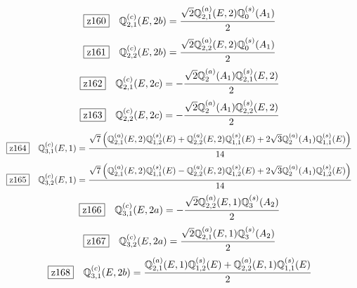 \documentclass[fleqn,10pt,landscape]{jsarticle}
\begin{document}
\begin{dmath*}
\hspace*{3mm}\fbox{z160}\quad \mathbb{Q}_{2,1}^{(c)}(E,2b)=\frac{\sqrt{2} \mathbb{Q}_{2,1}^{(a)}(E,2) \mathbb{Q}_{0}^{(s)}(A_{1})}{2}
\end{dmath*}
\begin{dmath*}
\hspace*{3mm}\fbox{z161}\quad \mathbb{Q}_{2,2}^{(c)}(E,2b)=\frac{\sqrt{2} \mathbb{Q}_{2,2}^{(a)}(E,2) \mathbb{Q}_{0}^{(s)}(A_{1})}{2}
\end{dmath*}
\begin{dmath*}
\hspace*{3mm}\fbox{z162}\quad \mathbb{Q}_{2,1}^{(c)}(E,2c)=- \frac{\sqrt{2} \mathbb{Q}_{2}^{(a)}(A_{1}) \mathbb{Q}_{2,1}^{(s)}(E,2)}{2}
\end{dmath*}
\begin{dmath*}
\hspace*{3mm}\fbox{z163}\quad \mathbb{Q}_{2,2}^{(c)}(E,2c)=- \frac{\sqrt{2} \mathbb{Q}_{2}^{(a)}(A_{1}) \mathbb{Q}_{2,2}^{(s)}(E,2)}{2}
\end{dmath*}
\begin{dmath*}
\hspace*{3mm}\fbox{z164}\quad \mathbb{Q}_{3,1}^{(c)}(E,1)=\frac{\sqrt{7} \left(\mathbb{Q}_{2,1}^{(a)}(E,2) \mathbb{Q}_{1,2}^{(s)}(E) + \mathbb{Q}_{2,2}^{(a)}(E,2) \mathbb{Q}_{1,1}^{(s)}(E) + 2 \sqrt{3} \mathbb{Q}_{2}^{(a)}(A_{1}) \mathbb{Q}_{1,1}^{(s)}(E)\right)}{14}
\end{dmath*}
\begin{dmath*}
\hspace*{3mm}\fbox{z165}\quad \mathbb{Q}_{3,2}^{(c)}(E,1)=\frac{\sqrt{7} \left(\mathbb{Q}_{2,1}^{(a)}(E,2) \mathbb{Q}_{1,1}^{(s)}(E) - \mathbb{Q}_{2,2}^{(a)}(E,2) \mathbb{Q}_{1,2}^{(s)}(E) + 2 \sqrt{3} \mathbb{Q}_{2}^{(a)}(A_{1}) \mathbb{Q}_{1,2}^{(s)}(E)\right)}{14}
\end{dmath*}
\begin{dmath*}
\hspace*{3mm}\fbox{z166}\quad \mathbb{Q}_{3,1}^{(c)}(E,2a)=- \frac{\sqrt{2} \mathbb{Q}_{2,2}^{(a)}(E,1) \mathbb{Q}_{3}^{(s)}(A_{2})}{2}
\end{dmath*}
\begin{dmath*}
\hspace*{3mm}\fbox{z167}\quad \mathbb{Q}_{3,2}^{(c)}(E,2a)=\frac{\sqrt{2} \mathbb{Q}_{2,1}^{(a)}(E,1) \mathbb{Q}_{3}^{(s)}(A_{2})}{2}
\end{dmath*}
\begin{dmath*}
\hspace*{3mm}\fbox{z168}\quad \mathbb{Q}_{3,1}^{(c)}(E,2b)=\frac{\mathbb{Q}_{2,1}^{(a)}(E,1) \mathbb{Q}_{1,2}^{(s)}(E) + \mathbb{Q}_{2,2}^{(a)}(E,1) \mathbb{Q}_{1,1}^{(s)}(E)}{2}
\end{dmath*}
\end{document}
